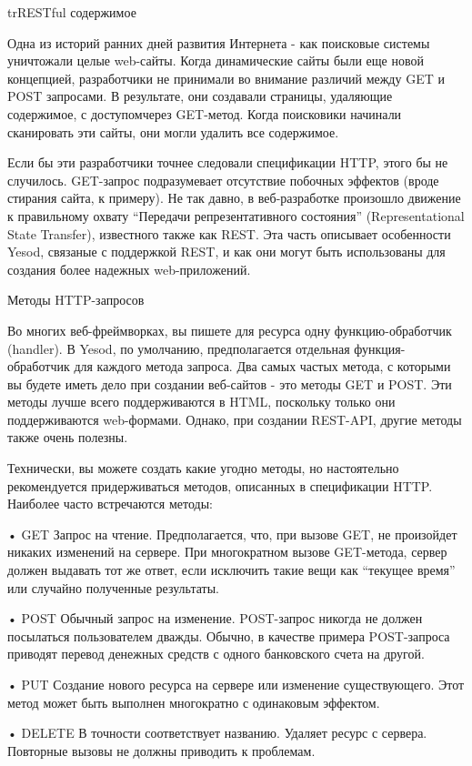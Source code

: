 trRESTful содержимое

Одна из историй ранних дней развития Интернета - как поисковые системы уничтожали целые web-сайты. Когда динамические сайты были еще новой концепцией, разработчики не принимали во внимание различий между GET и POST запросами. В результате, они создавали страницы, удаляющие содержимое, с доступомчерез GET-метод. Когда поисковики начинали сканировать эти сайты, они могли удалить все содержимое.

Если бы эти разработчики точнее следовали спецификации HTTP, этого бы не случилось. GET-запрос подразумевает отсутствие побочных эффектов (вроде стирания сайта, к примеру). Не так давно, в веб-разработке произошло движение к правильному охвату “Передачи репрезентативного состояния” (Representational State Transfer), известного также как REST. Эта часть описывает особенности Yesod, связаные с поддержкой REST, и как они могут быть использованы для создания более надежных web-приложений.

Методы HTTP-запросов

Во многих веб-фреймворках, вы пишете для ресурса одну функцию-обработчик (handler). В Yesod, по умолчанию, предполагается отдельная функция-обработчик для каждого метода запроса. Два самых частых метода, с которыми вы будете иметь дело при создании веб-сайтов - это методы GET и POST. Эти методы лучше всего поддерживаются в HTML, поскольку только они поддерживаются web-формами. Однако, при создании REST-API, другие методы также очень полезны.

Технически, вы можете создать какие угодно методы, но настоятельно рекомендуется придерживаться методов, описанных в спецификации HTTP. Наиболее часто встречаются методы:

• GET
Запрос на чтение. Предполагается, что, при вызове GET, не произойдет никаких изменений на сервере. При многократном вызове GET-метода, сервер должен выдавать тот же ответ, если исключить такие вещи как “текущее время” или случайно полученные результаты.

• POST
Обычный запрос на изменение. POST-запрос никогда не должен посылаться пользователем дважды. Обычно, в качестве примера POST-запроса приводят перевод денежных средств с одного банковского счета на другой.

• PUT
Создание нового ресурса на сервере или изменение существующего. Этот метод может быть выполнен многократно с одинаковым эффектом.

• DELETE
В точности соответствует названию. Удаляет ресурс с сервера. Повторные вызовы не должны приводить к проблемам.

